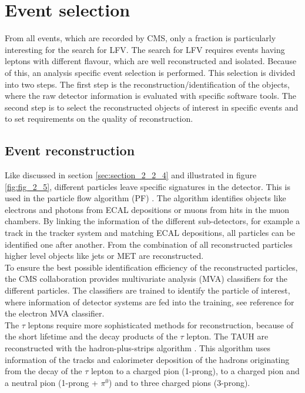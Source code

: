 \section{Event selection}
\label{sec:section_3_2}

From all events, which are recorded by \gls{CMS}, only a fraction is particularly interesting for the search for \gls{LFV}. The search for \gls{LFV} requires events having leptons with different flavour, which are well reconstructed and isolated. Because of this, an analysis specific event selection is performed. This selection is divided into two steps. The first step is the reconstruction/identification of the objects, where the raw detector information is evaluated with specific software tools. The second step is to select the reconstructed objects of interest in specific events and to set requirements on the quality of reconstruction. 


\subsection{Event reconstruction}
\label{sec:section_3_2_1}

Like discussed in section \ref{sec:section_2_2_4} and illustrated in figure \ref{fig:fig_2_5}, different particles leave specific signatures in the detector. This is used in the particle flow algorithm (\gls{PF}) \cite{PF}. The algorithm identifies objects like electrons and photons from \gls{ECAL} depositions or muons from hits in the muon chambers. By linking the information of the different sub-detectors, for example a track in the tracker system and matching \gls{ECAL} depositions, all particles can be identified one after another.  From the combination of all reconstructed particles higher level objects like jets or \gls{MET} are reconstructed. \\

To ensure the best possible identification efficiency of the reconstructed particles, the \gls{CMS} collaboration provides multivariate analysis (\gls{MVA}) classifiers for the different particles. The classifiers are trained to identify the particle of interest, where information of detector systems are fed into the training, see reference \cite{ERECO} for the electron \gls{MVA} classifier. \\

The $\tau$ leptons require more sophisticated methods for reconstruction, because of the short lifetime and the decay products of the $\tau$ lepton. The \gls{TAUH} are reconstructed with the hadron-plus-strips algorithm \cite{TAURECO}. This algorithm uses information of the tracks and calorimeter deposition of the hadrons originating from the decay of the $\tau$ lepton to a charged pion (1-prong), to a charged pion and a neutral pion (1-prong + $\pi^0$) and to three charged pions (3-prong). \\

